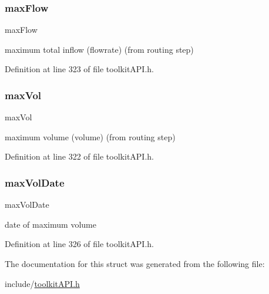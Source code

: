 \mbox{\label{struct_s_m___storage_stats_a4d84bca5454f3903c44fe865e44674f5}} 
\subsubsection{\texorpdfstring{maxFlow}{maxFlow}}
{\footnotesize\ttfamily max\+Flow}

maximum total inflow (flowrate) (from routing step) 

Definition at line 323 of file toolkit\+A\+P\+I.\+h.

\mbox{\label{struct_s_m___storage_stats_a4e178bd9894a08b39d615b68b788e09e}} 
\subsubsection{\texorpdfstring{maxVol}{maxVol}}
{\footnotesize\ttfamily max\+Vol}

maximum volume (volume) (from routing step) 

Definition at line 322 of file toolkit\+A\+P\+I.\+h.

\mbox{\label{struct_s_m___storage_stats_aa1b855c3609187dd317a0d75169769ab}} 
\subsubsection{\texorpdfstring{maxVolDate}{maxVolDate}}
{\footnotesize\ttfamily max\+Vol\+Date}

date of maximum volume 

Definition at line 326 of file toolkit\+A\+P\+I.\+h.



The documentation for this struct was generated from the following file\+:\begin{DoxyCompactItemize}
\item 
include/\mbox{\hyperlink{toolkit_a_p_i_8h}{toolkit\+A\+P\+I.\+h}}\end{DoxyCompactItemize}
